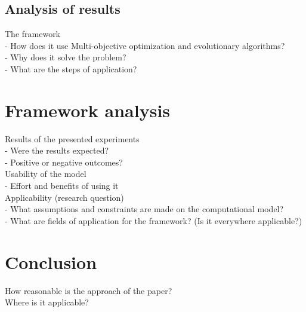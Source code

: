 \documentclass[12pt,twoside]{article}
\theoremstyle{plain}
\theoremstyle{definition}
\theoremstyle{remark}
\begin{document}
\subsection{Analysis of results}

The framework\\
- How does it use Multi-objective optimization and evolutionary algorithms?\\
- Why does it solve the problem?\\
- What are the steps of application?\\

\section{Framework analysis}
\label{sec:analysis}

Results of the presented experiments\\
- Were the results expected?\\
- Positive or negative outcomes?\\
Usability of the model\\
- Effort and benefits of using it\\
Applicability (research question)\\
- What assumptions and constraints are made on the computational model?\\
- What are fields of application for the framework? (Is it everywhere applicable?)\\

\section{Conclusion}
\label{sec:concl}

How reasonable is the approach of the paper?\\
Where is it applicable?

%
%
\newpage


\end{document}
